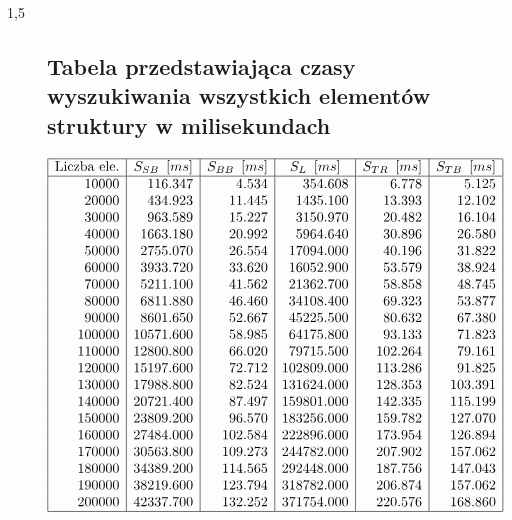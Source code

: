 \documentclass[polish,polish,a4paper]{article}
\begin{document}
\begin{spacing}{1,5}
\begin{figure}[H]
	\subsection*{Tabela przedstawiająca czasy wyszukiwania wszystkich elementów struktury w milisekundach}
	\centering
	\begin{equation*}
	\begin{array}{|r|r|r|r|r|r|}
	\hline
	\multicolumn{1}{|c|}{$Liczba ele.$}&\multicolumn{1}{c|}{S_{SB}\enskip[ms]}&\multicolumn{1}{c|}{S_{BB}\enskip[ms]}&\multicolumn{1}{c|}{S_{L}\enskip[ms]}&\multicolumn{1}{c|}{S_{TR}\enskip[ms]}&\multicolumn{1}{c|}{S_{TB}\enskip[ms]}\\ \hline
10000&116.347&4.534&354.608&6.778&5.125\\
20000&434.923&11.445&1435.100&13.393&12.102\\
30000&963.589&15.227&3150.970&20.482&16.104\\
40000&1663.180&20.992&5964.640&30.896&26.580\\
50000&2755.070&26.554&17094.000&40.196&31.822\\
60000&3933.720&33.620&16052.900&53.579&38.924\\
70000&5211.100&41.562&21362.700&58.858&48.745\\
80000&6811.880&46.460&34108.400&69.323&53.877\\
90000&8601.650&52.667&45225.500&80.632&67.380\\
100000&10571.600&58.985&64175.800&93.133&71.823\\
110000&12800.800&66.020&79715.500&102.264&79.161\\
120000&15197.600&72.712&102809.000&113.286&91.825\\
130000&17988.800&82.524&131624.000&128.353&103.391\\
140000&20721.400&87.497&159801.000&142.335&115.199\\
150000&23809.200&96.570&183256.000&159.782&127.070\\
160000&27484.000&102.584&222896.000&173.954&126.894\\
170000&30563.800&109.273&244782.000&207.902&157.062\\
180000&34389.200&114.565&292448.000&187.756&147.043\\
190000&38219.600&123.794&318782.000&206.874&157.062\\
200000&42337.700&132.252&371754.000&220.576&168.860\\\hline
	\end{array}
	\end{equation*}
\end{figure}
\end{spacing}
	
\end{document}
